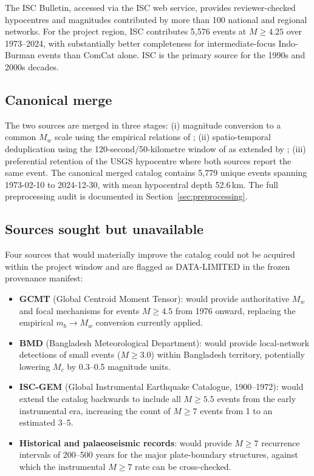 \documentclass[10pt,a4paper,twocolumn]{article}
\begin{document}
The ISC Bulletin, accessed via the ISC web service, provides reviewer-checked hypocentres and magnitudes contributed by more than 100 national and regional networks. For the project region, ISC contributes 5{,}576 events at $M\geq4.25$ over 1973--2024, with substantially better completeness for intermediate-focus Indo-Burman events than ComCat alone. ISC is the primary source for the 1990s and 2000s decades.

\subsection{Canonical merge}

The two sources are merged in three stages: (i) magnitude conversion to a common $M_w$ scale using the empirical relations of \cite{scordilis2006}; (ii) spatio-temporal deduplication using the 120-second/50-kilometre window of \cite{gardner1974} as extended by \cite{reasenberg1985}; (iii) preferential retention of the USGS hypocentre where both sources report the same event. The canonical merged catalog contains 5{,}779 unique events spanning 1973-02-10 to 2024-12-30, with mean hypocentral depth 52.6\,km. The full preprocessing audit is documented in Section~\ref{sec:preprocessing}.

\subsection{Sources sought but unavailable}

Four sources that would materially improve the catalog could not be acquired within the project window and are flagged as DATA-LIMITED in the frozen provenance manifest:

\begin{itemize}[leftmargin=1.2em,itemsep=2pt,topsep=2pt]
\item \textbf{GCMT} (Global Centroid Moment Tensor): would provide authoritative $M_w$ and focal mechanisms for events $M\geq4.5$ from 1976 onward, replacing the empirical $m_b\!\to\!M_w$ conversion currently applied.
\item \textbf{BMD} (Bangladesh Meteorological Department): would provide local-network detections of small events ($M\geq3.0$) within Bangladesh territory, potentially lowering $M_c$ by 0.3--0.5 magnitude units.
\item \textbf{ISC-GEM} (Global Instrumental Earthquake Catalogue, 1900--1972): would extend the catalog backwards to include all $M\geq5.5$ events from the early instrumental era, increasing the count of $M\geq7$ events from 1 to an estimated 3--5.
\item \textbf{Historical and palaeoseismic records}: would provide $M\geq7$ recurrence intervals of 200--500 years for the major plate-boundary structures, against which the instrumental $M\geq7$ rate can be cross-checked.
\end{itemize}
\end{document}
